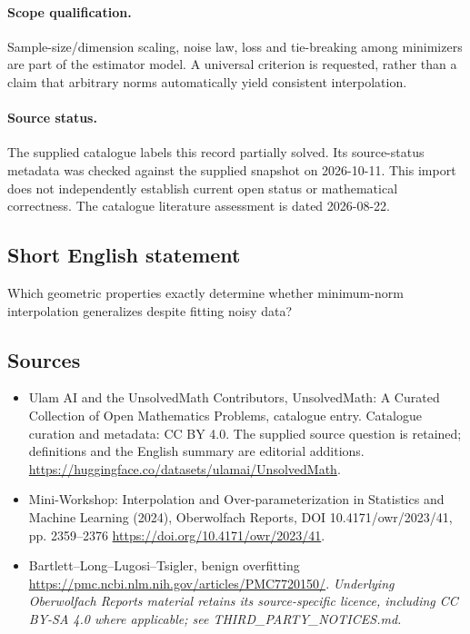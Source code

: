 \documentclass[11pt]{article}
\begin{document}
\paragraph{Scope qualification.}
Sample-size/dimension scaling, noise law, loss and tie-breaking among minimizers are part of the estimator model. A universal criterion is requested, rather than a claim that arbitrary norms automatically yield consistent interpolation.
\paragraph{Source status.}
The supplied catalogue labels this record partially solved. Its source-status metadata was checked against the supplied snapshot on 2026-10-11. This import does not independently establish current open status or mathematical correctness. The catalogue literature assessment is dated 2026-08-22.
\subsection{Short English statement}
Which geometric properties exactly determine whether minimum-norm interpolation generalizes despite fitting noisy data?
\subsection{Sources}
\begin{itemize}
\item[S1] Ulam AI and the UnsolvedMath Contributors, UnsolvedMath: A Curated Collection of Open Mathematics Problems, catalogue entry. Catalogue curation and metadata: CC BY 4.0. The supplied source question is retained; definitions and the English summary are editorial additions.
\url{https://huggingface.co/datasets/ulamai/UnsolvedMath}.
\item[S2] Mini-Workshop: Interpolation and Over-parameterization in Statistics and Machine Learning​ (2024), Oberwolfach Reports, DOI 10.4171/owr/2023/41, pp. 2359--2376
\url{https://doi.org/10.4171/owr/2023/41}.
\item[S3] Bartlett--Long--Lugosi--Tsigler, benign overfitting
\url{https://pmc.ncbi.nlm.nih.gov/articles/PMC7720150/}.
\textit{Underlying Oberwolfach Reports material retains its source-specific licence, including CC BY-SA 4.0 where applicable; see THIRD\_PARTY\_NOTICES.md.}
\end{itemize}
\end{document}
